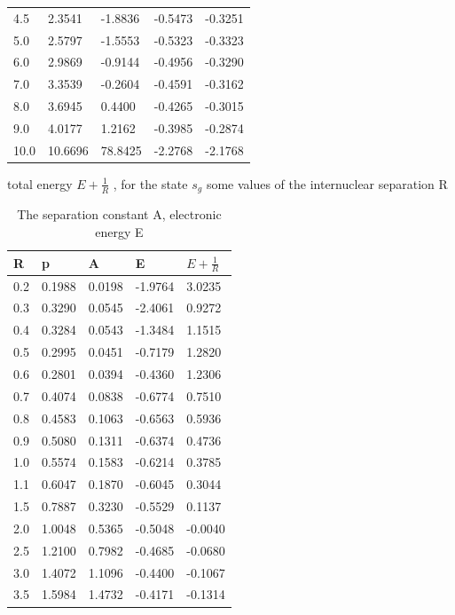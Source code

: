 \begin{table}[ht]
\begin{tabular}{ m{6em} m{6em}  m{6em}  m{6em} m{6em} }
        4.5 & 2.3541 & -1.8836 & -0.5473 & -0.3251 \\
        5.0 & 2.5797 & -1.5553 & -0.5323 & -0.3323 \\
        6.0 & 2.9869 & -0.9144 & -0.4956 & -0.3290 \\
        7.0 & 3.3539 & -0.2604 & -0.4591 & -0.3162 \\
        8.0 & 3.6945 & 0.4400 & -0.4265 & -0.3015 \\
        9.0 & 4.0177 & 1.2162 & -0.3985 & -0.2874 \\
        10.0 & 10.6696 & 78.8425 & -2.2768 & -2.1768 \\
      \hline
      \end{tabular}
    \end{table}

  \begin{table}[ht]
      \caption{ The separation constant A, electronic energy E}{ total energy $ E + \frac{1}{R} $ , for the state $ s_g $ some values of the internuclear separation R }
      \centering
        \begin{tabular}{ m{6em} m{6em}  m{6em}  m{6em} m{6em} }
		\hline
		    R & p & A & E & $ E + \frac{1}{R} $ \\ \hline \hline
        0.2 & 0.1988 & 0.0198 & -1.9764 & 3.0235 \\
        0.3 & 0.3290 & 0.0545 & -2.4061 & 0.9272 \\
        0.4 & 0.3284 & 0.0543 & -1.3484 & 1.1515 \\
        0.5 & 0.2995 & 0.0451 & -0.7179 & 1.2820 \\
        0.6 & 0.2801 & 0.0394 & -0.4360 & 1.2306 \\
        0.7 & 0.4074 & 0.0838 & -0.6774 & 0.7510 \\
        0.8 & 0.4583 & 0.1063 & -0.6563 & 0.5936 \\
        0.9 & 0.5080 & 0.1311 & -0.6374 & 0.4736 \\
        1.0 & 0.5574 & 0.1583 & -0.6214 & 0.3785 \\
        1.1 & 0.6047 & 0.1870 & -0.6045 & 0.3044 \\
        1.5 & 0.7887 & 0.3230 & -0.5529 & 0.1137 \\
        2.0 & 1.0048 & 0.5365 & -0.5048 & -0.0040 \\
        2.5 & 1.2100 & 0.7982 & -0.4685 & -0.0680 \\
        3.0 & 1.4072 & 1.1096 & -0.4400 & -0.1067 \\
        3.5 & 1.5984 & 1.4732 & -0.4171 & -0.1314 \\

\end{tabular}
\end{table}
